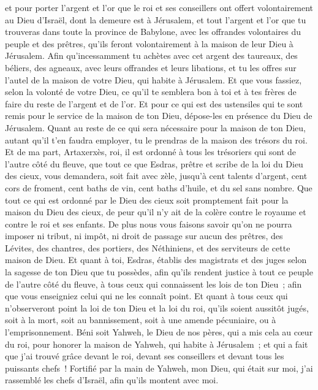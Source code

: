 \begin{multicols}{2}
et pour porter l'argent et l'or que le roi et ses conseillers ont offert volontairement au Dieu d'Israël, dont la demeure est à Jérusalem,
et tout l'argent et l'or que tu trouveras dans toute la province de Babylone, avec les offrandes volontaires du peuple et des prêtres, qu'ils feront volontairement à la maison de leur Dieu à Jérusalem.
Afin qu'incessamment tu achètes avec cet argent des taureaux, des béliers, des agneaux, avec leurs offrandes et leurs libations, et tu les offres sur l'autel de la maison de votre Dieu, qui habite à Jérusalem.
Et que vous fassiez, selon la volonté de votre Dieu, ce qu'il te semblera bon à toi et à tes frères de faire du reste de l'argent et de l'or.
Et pour ce qui est des ustensiles qui te sont remis pour le service de la maison de ton Dieu, dépose-les en présence du Dieu de Jérusalem.
Quant au reste de ce qui sera nécessaire pour la maison de ton Dieu, autant qu'il t'en faudra employer, tu le prendras de la maison des trésors du roi.
Et de ma part, Artaxerxès, roi, il est ordonné à tous les trésoriers qui sont de l'autre côté du fleuve, que tout ce que Esdras, prêtre et scribe de la loi du Dieu des cieux, vous demandera, soit fait avec zèle,
jusqu'à cent talents d'argent, cent cors de froment, cent baths de vin, cent baths d'huile, et du sel sans nombre.
Que tout ce qui est ordonné par le Dieu des cieux soit promptement fait pour la maison du Dieu des cieux, de peur qu'il n'y ait de la colère contre le royaume et contre le roi et ses enfants.
De plus nous vous faisons savoir qu'on ne pourra imposer ni tribut, ni impôt, ni droit de passage sur aucun des prêtres, des Lévites, des chantres, des portiers, des Néthiniens, et des serviteurs de cette maison de Dieu.
Et quant à toi, Esdras, établis des magistrats et des juges selon la sagesse de ton Dieu que tu possèdes, afin qu'ils rendent justice à tout ce peuple de l'autre côté du fleuve, à tous ceux qui connaissent les lois de ton Dieu~; afin que vous enseigniez celui qui ne les connaît point.
Et quant à tous ceux qui n'observeront point la loi de ton Dieu et la loi du roi, qu'ils soient aussitôt jugés, soit à la mort, soit au bannissement, soit à une amende pécuniaire, ou à l'emprisonnement.
Béni soit Yahweh, le Dieu de nos pères, qui a mis cela au cœur du roi, pour honorer la maison de Yahweh, qui habite à Jérusalem~;
et qui a fait que j'ai trouvé grâce devant le roi, devant ses conseillers et devant tous les puissants chefs~! Fortifié par la main de Yahweh, mon Dieu, qui était sur moi, j'ai rassemblé les chefs d'Israël, afin qu'ils montent avec moi.

\end{multicols}

